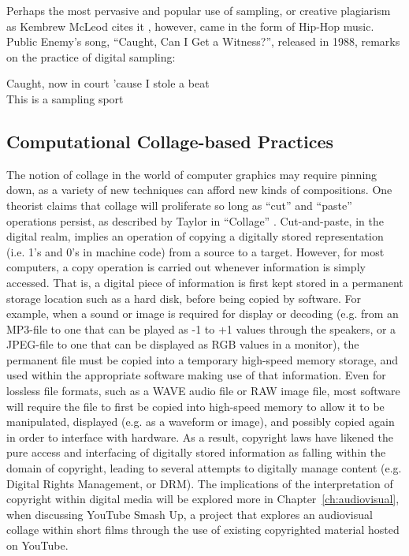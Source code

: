 \documentclass[a4paper,10pt,final]{ThesisStyle}
\begin{document}
Perhaps the most pervasive and popular use of sampling, or creative plagiarism as Kembrew McLeod cites it \cite{McLeod2011}, however, came in the form of Hip-Hop music.  Public Enemy's song, ``Caught, Can I Get a Witness?'', released in 1988, remarks on the practice of digital sampling: 
\begin{verseb}
Caught, now in court 'cause I stole a beat\\
This is a sampling sport
\end{verseb}




\subsection{Computational Collage-based Practices}

The notion of collage in the world of computer graphics may require pinning down, as a variety of new techniques can afford new kinds of compositions.  One theorist claims that collage will proliferate so long as ``cut'' and ``paste'' operations persist, as described by Taylor in ``Collage'' \cite{Taylor2006b}.   Cut-and-paste, in the digital realm, implies an operation of copying a digitally stored representation (i.e. 1's and 0's in machine code) from a source to a target.  However, for most computers, a copy operation is carried out whenever information is simply accessed.  That is, a digital piece of information is first kept stored in a permanent storage location such as a hard disk, before being copied by software.  For example, when a sound or image is required for display or decoding (e.g. from an MP3-file to one that can be played as -1 to +1 values through the speakers, or a JPEG-file to one that can be displayed as RGB values in a monitor), the permanent file must be copied into a temporary high-speed memory storage, and used within the appropriate software making use of that information.  Even for lossless file formats, such as a WAVE audio file or RAW image file, most software will require the file to first be copied into high-speed memory to allow it to be manipulated, displayed (e.g. as a waveform or image), and possibly copied again in order to interface with hardware.  As a result, copyright laws have likened the pure access and interfacing of digitally stored information as falling within the domain of copyright, leading to several attempts to digitally manage content (e.g. Digital Rights Management, or DRM).  The implications of the interpretation of copyright within digital media will be explored more in Chapter~\ref{ch:audiovisual}, when discussing YouTube Smash Up, a project that explores an audiovisual collage within short films through the use of existing copyrighted material hosted on YouTube.  
\end{document}

